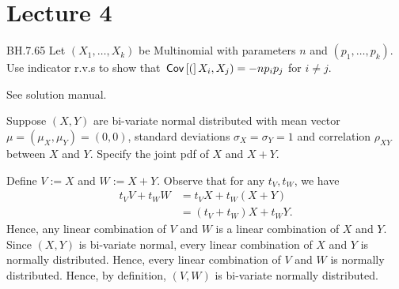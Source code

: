 \documentclass[lectures]{subfiles}
\begin{document}
\section{Lecture 4}




\begin{exercise} BH.7.65 Let $(X_1, \ldots, X_k)$ be Multinomial with parameters $n$ and $(p_1, \ldots, p_k)$. Use indicator r.v.s to show that $\,\mathsf{Cov}\left[(\right]X_i, X_j) = -n p_i p_j$ for $i \neq j$.

\begin{solution}
See solution manual.
\end{solution}
\end{exercise}


\begin{exercise}
Suppose $(X,Y)$ are bi-variate normal distributed with mean vector $\mu = (\mu_X, \mu_Y) = (0,0)$, standard deviations $\sigma_X = \sigma_Y = 1$ and correlation $\rho_{X Y}$ between $X$ and $Y$. Specify the joint pdf of $X$ and $X + Y$.
\begin{solution}
Define $V := X$ and $W := X + Y$. Observe that for any $t_V, t_W$, we have
\begin{align}
    t_V V + t_W W &= t_V X + t_W (X + Y) \\
    &= (t_V + t_W) X + t_W Y.
\end{align}
Hence, any linear combination of $V$ and $W$ is a linear combination of $X$ and $Y$. Since $(X,Y)$ is bi-variate normal, every linear combination of $X$ and $Y$ is normally distributed. Hence, every linear combination of $V$ and $W$ is normally distributed. Hence, by definition, $(V,W)$ is bi-variate normally distributed.


\end{solution}
\end{exercise}
\end{document}
